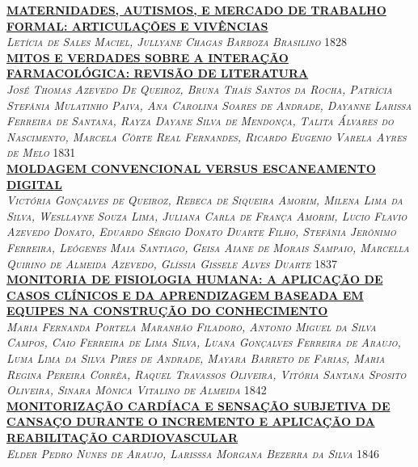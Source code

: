 \noindent \textsc{\hyperlink{trabalhos/251771.pdf.1}{\textbf{MATERNIDADES, AUTISMOS, E MERCADO DE TRABALHO  FORMAL: ARTICULAÇÕES E VIVÊNCIAS}}}\\ 
\noindent \textsc{\textit{Letícia de Sales Maciel, Jullyane Chagas Barboza Brasilino}} \hfill 1828\\ 

\noindent \textsc{\hyperlink{trabalhos/249980.pdf.1}{\textbf{MITOS E VERDADES SOBRE A INTERAÇÃO FARMACOLÓGICA: REVISÃO DE LITERATURA}}}\\ 
\noindent \textsc{\textit{José Thomas Azevedo De Queiroz, Bruna Thaís Santos da Rocha, Patrícia Stefânia Mulatinho Paiva, Ana Carolina Soares de Andrade, Dayanne Larissa Ferreira de Santana, Rayza Dayane Silva de Mendonça, Talita Álvares do Nascimento, Marcela Côrte Real Fernandes, Ricardo Eugenio Varela Ayres de Melo}} \hfill 1831\\ 

\noindent \textsc{\hyperlink{trabalhos/250026.pdf.1}{\textbf{MOLDAGEM CONVENCIONAL VERSUS ESCANEAMENTO DIGITAL}}}\\ 
\noindent \textsc{\textit{Victória Gonçalves de Queiroz, Rebeca de Siqueira Amorim, Milena Lima da Silva, Wesllayne Souza Lima, Juliana Carla de França Amorim, Lucio Flavio Azevedo Donato, Eduardo Sérgio Donato Duarte Filho, Stefânia Jerônimo Ferreira, Leógenes Maia Santiago, Geisa Aiane de Morais Sampaio, Marcella Quirino de Almeida Azevedo, Glíssia Gissele Alves Duarte}} \hfill 1837\\ 

\noindent \textsc{\hyperlink{trabalhos/251602.pdf.1}{\textbf{MONITORIA DE FISIOLOGIA HUMANA: A APLICAÇÃO DE CASOS CLÍNICOS E DA APRENDIZAGEM BASEADA EM EQUIPES NA CONSTRUÇÃO DO CONHECIMENTO}}}\\ 
\noindent \textsc{\textit{Maria Fernanda Portela Maranhão Filadoro, Antonio Miguel da Silva Campos, Caio Ferreira de Lima Silva, Luana Gonçalves Ferreira de Araujo, Luma Lima da Silva Pires de Andrade, Mayara Barreto de Farias, Maria Regina Pereira Corrêa, Raquel Travassos Oliveira, Vitória Santana Sposito Oliveira, Sinara Mônica Vitalino de Almeida}} \hfill 1842\\ 

\noindent \textsc{\hyperlink{trabalhos/250375.pdf.1}{\textbf{MONITORIZAÇÃO CARDÍACA E SENSAÇÃO SUBJETIVA DE CANSAÇO DURANTE O INCREMENTO E APLICAÇÃO DA REABILITAÇÃO CARDIOVASCULAR }}}\\ 
\noindent \textsc{\textit{Elder Pedro Nunes de Araujo, Larisssa Morgana Bezerra da Silva}} \hfill 1846\\ 

